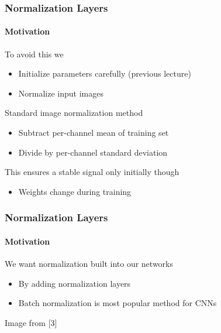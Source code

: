 \documentclass[xetex,professionalfont]{beamer}
\renewcommand\emph[1]{\textcolor{tuwcvl_cvl_blue}{#1}}
\begin{document}
\begin{frame}
  \frametitle{Normalization Layers}
  \framesubtitle{Motivation}

To avoid this we
\begin{itemize}
  \item Initialize parameters carefully (previous lecture)
  \item Normalize input images 
\end{itemize}

\bigskip

Standard image normalization method
\begin{itemize}
  \item Subtract per-channel mean of training set
  \item Divide by per-channel standard deviation
\end{itemize}

\bigskip

This ensures a stable signal only initially though
\begin{itemize}
  \item Weights change during training
\end{itemize}
  
  \end{frame}
  
  
  \begin{frame}
    \frametitle{Normalization Layers}
    \framesubtitle{Motivation}
  
  We want normalization built into our networks
  \begin{itemize}
      \item By adding \emph{normalization layers}
      \item Batch normalization is most popular method for CNNs
  \end{itemize}

  \medskip
  
  \begin{center}
      {\centering Image from [3]}
  \end{center}
  
  \end{frame}
  
\end{document}
